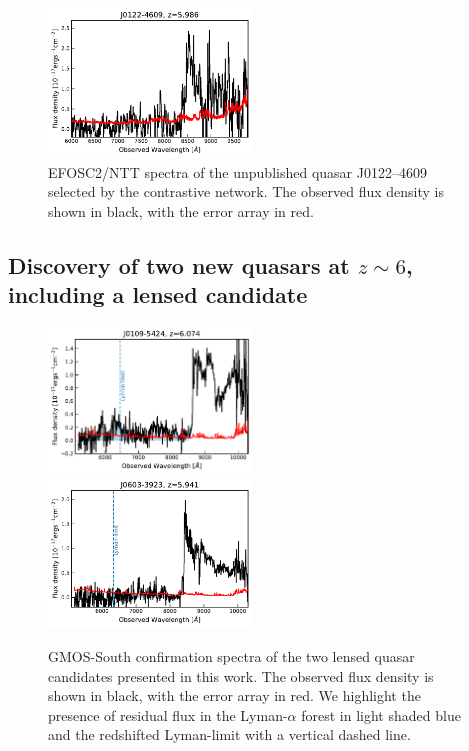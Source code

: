 \documentclass[fleqn,usenatbib]{mnras}
\begin{document}
\begin{figure}
    \centering
    \includegraphics[width=0.48\textwidth]{figs/J0122-4609_1Dspec.pdf} 
    \caption{EFOSC2/NTT spectra of the unpublished quasar J0122--4609 selected by the contrastive network.
    The observed flux density is shown in black, with the error array in red.}
    \label{fig:spectra_archival}
\end{figure}

\subsection{Discovery of two new quasars at \texorpdfstring{$z\sim 6$}{TEXT}, including a lensed candidate}

\begin{figure}
    \centering\includegraphics[width=0.48\textwidth]{figs/J0109-5424_1Dspec.pdf} \\
    \includegraphics[width=0.48\textwidth]{figs/J0603-3923_1Dspec.pdf} 
    \caption{GMOS-South confirmation spectra of the two lensed quasar candidates presented in this work. The observed flux density is shown in black, with the error array in red. We highlight the presence of residual flux in the Lyman-$\alpha$ forest in light shaded blue and the redshifted Lyman-limit with a vertical dashed line.}
    \label{fig:spectra_gemini}
\end{figure}
\end{document}
